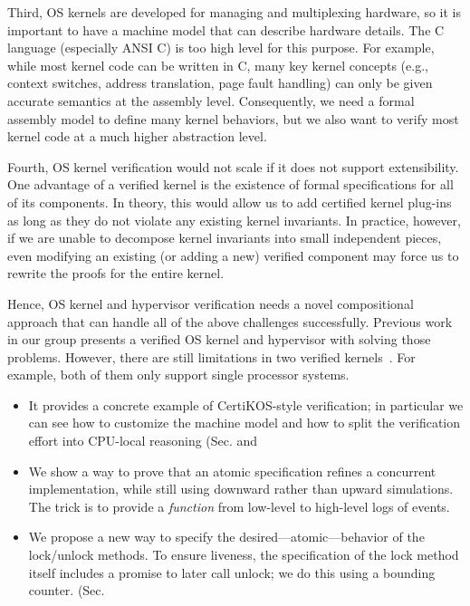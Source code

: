 {Third, OS kernels are developed for managing and multiplexing hardware, so it is important to have a machine model that can describe hardware details.
The C language (especially ANSI C) is too high level for this purpose. For example, while most kernel code can be written in C, many key kernel concepts (e.g., context switches, address translation, page fault handling) can only be given accurate semantics at the assembly level. Consequently, we need a formal assembly model to define many kernel behaviors, but we also want to verify most kernel code at a much higher abstraction level.

Fourth, OS kernel verification would not scale if it does not  support extensibility.
One advantage of a verified kernel is the existence of formal specifications for all of its components. 
In theory, this would allow us to add certified kernel plug-ins as long as they do not violate any existing kernel invariants.
In practice, however, if we are unable to decompose kernel invariants into small independent pieces, even modifying an existing (or adding a new) verified component may force us to rewrite the proofs for the entire kernel.

Hence, OS kernel and hypervisor verification needs a novel compositional approach that can handle all of the above challenges successfully. 
Previous work~\cite{deepspec} in our group presents a verified OS kernel and hypervisor with solving those problems. 
However, there are still limitations in two verified kernels~\cite{deepspec, klein2009sel4}.
For example, both of them only support single processor systems.
%



\begin{itemize}
\item It provides a concrete example of CertiKOS-style verification; in particular we can see how to customize the machine model    and how to split the verification effort into CPU-local reasoning (Sec. and 
  
\item We show a way to prove that an atomic specification refines a concurrent implementation, while still using downward rather than upward simulations. The trick is to provide a \emph{function} from low-level to high-level logs of events. 
\item We propose a new way to specify the desired---atomic---behavior of the lock/unlock methods. To ensure liveness, the specification of the lock method itself includes a promise to later call unlock; we do this using a bounding counter. (Sec.~


\end{itemize}}

